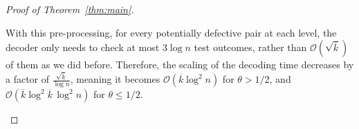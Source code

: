 \documentclass[journal]{IEEEtran}
\newcommand{\rEm}{\mathrm{E}_{\max}}
\theoremstyle{definition}
\theoremstyle{definition}
\newcommand{\Tc}{\mathcal{T}}
\newcommand{\PP}{\mathbb{P}}
\newcommand{\ER}{\mathrm{ER}}
\newcommand{\kb}{\overline{k}}
\newcommand{\bigO}{\mathcal{O}}
\begin{document}
\begin{proof}[Proof of Theorem~\ref{thm:main}]
\begin{itemize}
With this pre-processing, for every potentially defective pair at each level, the decoder only needs to check at most $3\log n$ test outcomes, rather than $\bigO(\sqrt{\kb})$ of them as we did before. Therefore, the scaling of the decoding time decreases by a factor of $\frac{\sqrt{\kb}}{\log n}$, meaning it becomes $\bigO(\kb\log^2 n)$ for $\theta>1/2$, and $\bigO(\kb\log^2\kb\,\log^2 n)$ for $\theta\le 1/2$.

                  
    
    
		
        
		

\end{itemize}
\end{proof}
\end{document}
